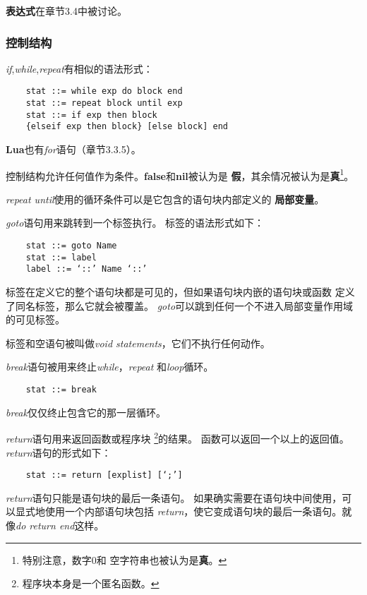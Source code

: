 \documentclass{ctexart}
\begin{document}
\textbf{表达式}在章节3.4中被讨论。

\subsubsection{控制结构}

\emph{if},\emph{while},\emph{repeat}有相似的语法形式：

\lstset{language=C}
\begin{lstlisting}
	stat ::= while exp do block end
	stat ::= repeat block until exp
	stat ::= if exp then block
	{elseif exp then block} [else block] end
\end{lstlisting}

\textbf{Lua}也有\emph{for}语句（章节3.3.5）。

控制结构允许任何值作为条件。\textbf{false}和\textbf{nil}被认为是
\textbf{假}，其余情况被认为是\textbf{真}\footnote{特别注意，数字$0$和
空字符串也被认为是\textbf{真}。}。

\emph{repeat until}使用的循环条件可以是它包含的语句块内部定义的
\textbf{局部变量}。

\emph{goto}语句用来跳转到一个标签执行。
标签的语法形式如下：

\lstset{language=C}
\begin{lstlisting}
	stat ::= goto Name
	stat ::= label
	label ::= ‘::’ Name ‘::’
\end{lstlisting}

标签在定义它的整个语句块都是可见的，但如果语句块内嵌的语句块或函数
定义了同名标签，那么它就会被覆盖。
\emph{goto}可以跳到任何一个不进入局部变量作用域的可见标签。

标签和空语句被叫做\emph{void statements}，它们不执行任何动作。

\emph{break}语句被用来终止\emph{while}，\emph{repeat}
和\emph{loop}循环。

\lstset{language=C}
\begin{lstlisting}
	stat ::= break
\end{lstlisting}

\emph{break}仅仅终止包含它的那一层循环。

\emph{return}语句用来返回函数或程序块
\footnote{程序块本身是一个匿名函数。}的结果。
函数可以返回一个以上的返回值。
\emph{return}语句的形式如下：

\lstset{language=C}
\begin{lstlisting}
	stat ::= return [explist] [‘;’]
\end{lstlisting}

\emph{return}语句只能是语句块的最后一条语句。
如果确实需要在语句块中间使用，可以显式地使用一个内部语句块包括
\emph{return}，使它变成语句块的最后一条语句。就像\emph{do return end}这样。
\end{document}
